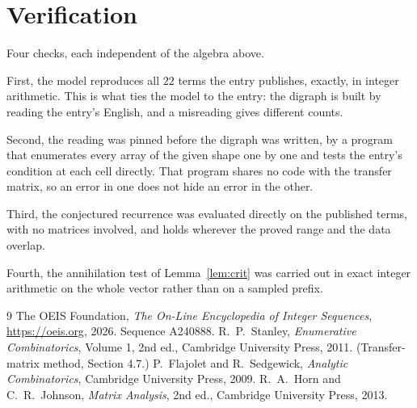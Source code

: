 \documentclass[11pt,a4paper]{article}
\theoremstyle{plain}
\theoremstyle{definition}
\begin{document}
\section{Verification}

Four checks, each independent of the algebra above.

First, the model reproduces all $22$ terms the entry publishes, exactly, in integer
arithmetic. This is what ties the model to the entry: the digraph is built by reading the
entry's English, and a misreading gives different counts.

Second, the reading was pinned before the digraph was written, by a program that enumerates
every array of the given shape one by one and tests the entry's condition at each cell
directly. That program shares no code with the transfer matrix, so an error in one does not
hide an error in the other.

Third, the conjectured recurrence was evaluated directly on the published terms, with no
matrices involved, and holds wherever the proved range and the data overlap.

Fourth, the annihilation test of Lemma~\ref{lem:crit} was carried out in exact integer
arithmetic on the whole vector rather than on a sampled prefix.

\begin{thebibliography}{9}
 The OEIS Foundation, \emph{The On-Line Encyclopedia of Integer
Sequences}, \url{https://oeis.org}, 2026. Sequence A240888.
 R.~P.~Stanley, \emph{Enumerative Combinatorics}, Volume 1, 2nd ed.,
Cambridge University Press, 2011. (Transfer-matrix method, Section 4.7.)
 P.~Flajolet and R.~Sedgewick, \emph{Analytic Combinatorics}, Cambridge
University Press, 2009.
 R.~A.~Horn and C.~R.~Johnson, \emph{Matrix Analysis}, 2nd ed., Cambridge
University Press, 2013.
\end{thebibliography}
\end{document}
